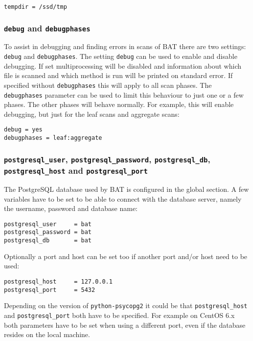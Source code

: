 \documentclass[10pt,a4paper]{article}
\begin{document}
\begin{verbatim}
tempdir = /ssd/tmp
\end{verbatim}

\subsubsection{\texttt{debug} and \texttt{debugphases}}

To assist in debugging and finding errors in scans of BAT there are two
settings: \texttt{debug} and \texttt{debugphases}. The setting \texttt{debug}
can be used to enable and disable debugging. If set multiprocessing will be
disabled and information about which file is scanned and which method is run
will be printed on standard error. If specified without \texttt{debugphases}
this will apply to all scan phases. The \texttt{debugphases} parameter can be
used to limit this behaviour to just one or a few phases. The other phases will
behave normally. For example, this will enable debugging, but just for the
leaf scans and aggregate scans:

\begin{verbatim}
debug = yes
debugphases = leaf:aggregate
\end{verbatim}

\subsubsection{\texttt{postgresql\_user}, \texttt{postgresql\_password}, \texttt{postgresql\_db}, \texttt{postgresql\_host} and \texttt{postgresql\_port}}

The PostgreSQL database used by BAT is configured in the global section. A few
variables have to be set to be able to connect with the database server, namely
the username, password and database name:

\begin{verbatim}
postgresql_user     = bat
postgresql_password = bat
postgresql_db       = bat
\end{verbatim}

Optionally a port and host can be set too if another port and/or host need to
be used:

\begin{verbatim}
postgresql_host     = 127.0.0.1
postgresql_port     = 5432
\end{verbatim}

Depending on the version of \texttt{python-psycopg2} it could be that
\texttt{postgresql\_host} and \texttt{postgresql\_port} both have to be
specified. For example on CentOS 6.x both parameters have to be set when using
a different port, even if the database resides on the local machine.
\end{document}
